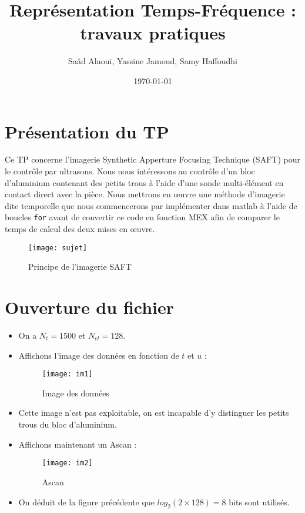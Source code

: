 \documentclass[12pt,a4paper,titlepage]{article}
\title{Représentation  Temps-Fréquence : travaux pratiques}
\author{Saâd Alaoui, Yassine Jamoud, Samy Haffoudhi}
\date{\today}
\begin{document}
\maketitle

\section{Présentation du TP}

Ce TP concerne l'imagerie Synthetic Apperture Focusing Technique (SAFT) pour le
contrôle par ultrasons. Nous nous intéressons au contrôle d'un bloc d'aluminium
contenant des petits trous à l'aide d'une sonde multi-élément en contact direct
avec la pièce. Nous mettrons en œuvre une méthode d'imagerie dite temporelle que
nous commencerons par implémenter dans matlab à l'aide de boucles \texttt{for} avant
de convertir ce code en fonction MEX afin de comparer le temps de calcul des deux
mises en œuvre.

\begin{figure}[H]
    \caption{Principe de l'imagerie SAFT}
    \texttt{[image: sujet]}
    \centering
\end{figure}

\section{Ouverture du fichier}

\begin{itemize}
    \item{On a $N_t = 1500$ et $N_{el} = 128$.}
    \item{Affichons l'image des données en fonction de $t$ et $u$ :

            \begin{figure}[H]
                \caption{Image des données}
                \texttt{[image: im1]}
                \centering
            \end{figure}
        }
    \item{Cette image n'est pas exploitable, on est incapable d'y distinguer les
        petits trous du bloc d'aluminium.}
    \item{Affichons maintenant un Ascan :

            \begin{figure}[H]
                \caption{Ascan}
                \texttt{[image: im2]}
                \centering
            \end{figure}
        }
    \item{On déduit de la figure précédente que $log_2(2 \times 128) = 8$ bits sont utilisés.}
\end{itemize}
\end{document}
